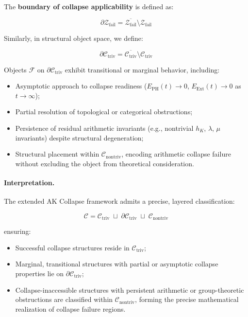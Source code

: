 \documentclass[11pt]{article}
\begin{document}
The \textbf{boundary of collapse applicability} is defined as:

\[
\partial \mathcal{Z}_{\mathrm{fail}} = \overline{\mathcal{Z}_{\mathrm{fail}}} \setminus \mathcal{Z}_{\mathrm{fail}}
\]

Similarly, in structural object space, we define:

\[
\partial \mathcal{C}_{\mathrm{triv}} = \overline{\mathcal{C}_{\mathrm{triv}}} \setminus \mathcal{C}_{\mathrm{triv}}
\]

Objects $\mathcal{F}$ on $\partial \mathcal{C}_{\mathrm{triv}}$ exhibit transitional or marginal behavior, including:

\begin{itemize}
    \item Asymptotic approach to collapse readiness ($E_{\mathrm{PH}}(t) \to 0$, $E_{\mathrm{Ext}}(t) \to 0$ as $t \to \infty$);
    \item Partial resolution of topological or categorical obstructions;
    \item Persistence of residual arithmetic invariants (e.g., nontrivial $h_K$, $\lambda$, $\mu$ invariants) despite structural degeneration;
    \item Structural placement within $\mathcal{C}_{\mathrm{nontriv}}$, encoding arithmetic collapse failure without excluding the object from theoretical consideration.
\end{itemize}

\paragraph{Interpretation.}
The extended AK Collapse framework admits a precise, layered classification:

\[
\mathcal{C} = \mathcal{C}_{\mathrm{triv}} \;\sqcup\; \partial \mathcal{C}_{\mathrm{triv}} \;\sqcup\; \mathcal{C}_{\mathrm{nontriv}}
\]

ensuring:

\begin{itemize}
    \item Successful collapse structures reside in $\mathcal{C}_{\mathrm{triv}}$;
    \item Marginal, transitional structures with partial or asymptotic collapse properties lie on $\partial \mathcal{C}_{\mathrm{triv}}$;
    \item Collapse-inaccessible structures with persistent arithmetic or group-theoretic obstructions are classified within $\mathcal{C}_{\mathrm{nontriv}}$, forming the precise mathematical realization of collapse failure regions.
\end{itemize}
\end{document}
